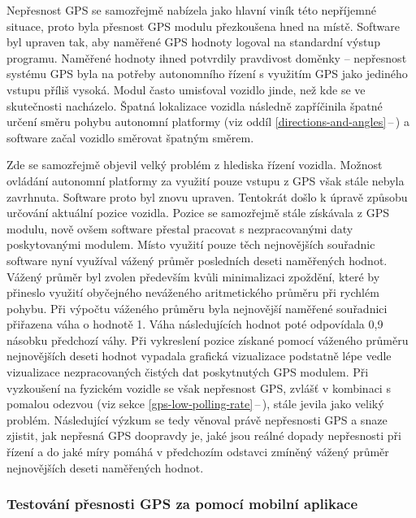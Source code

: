 \documentclass[czech, bachelor]{diploma}
\newcommand{\peteref}[1]{\ref{#1}\,--\,\nameref{#1}}
\begin{document}
Nepřesnost GPS se samozřejmě nabízela jako hlavní viník této nepříjemné situace, proto byla přesnost GPS modulu přezkoušena hned
na místě. Software byl upraven tak, aby naměřené GPS hodnoty logoval na standardní výstup programu. Naměřené hodnoty ihned
potvrdily pravdivost doměnky -- nepřesnost systému GPS byla na potřeby autonomního řízení s využitím GPS jako jediného vstupu
příliš vysoká. Modul často umisťoval vozidlo jinde, než kde se ve skutečnosti nacházelo. Špatná lokalizace vozidla následně
zapříčinila špatné určení směru pohybu autonomní platformy (viz oddíl \peteref{directions-and-angles}) a software začal vozidlo
směrovat špatným směrem.

Zde se samozřejmě objevil velký problém z hlediska řízení vozidla. Možnost ovládání autonomní platformy za využití pouze vstupu
z GPS však stále nebyla zavrhnuta. Software proto byl znovu upraven. Tentokrát došlo k úpravě způsobu určování aktuální pozice
vozidla. Pozice se samozřejmě stále získávala z GPS modulu, nově ovšem software přestal pracovat s nezpracovanými daty
poskytovanými modulem. Místo využití pouze těch nejnovějších souřadnic software nyní využíval vážený průměr posledních deseti
naměřených hodnot. Vážený průměr byl zvolen především kvůli minimalizaci zpoždění, které by přineslo využití obyčejného neváženého
aritmetického průměru při rychlém pohybu. Při výpočtu váženého průměru byla nejnovější naměřené souřadnici přiřazena váha
o hodnotě 1. Váha následujících hodnot poté odpovídala 0,9 násobku předchozí váhy. Při vykreslení pozice získané pomocí váženého
průměru nejnovějších deseti hodnot vypadala grafická vizualizace podstatně lépe vedle vizualizace nezpracovaných čistých dat
poskytnutých GPS modulem. Při vyzkoušení na fyzickém vozidle se však nepřesnost GPS, zvlášť v kombinaci s pomalou odezvou (viz
sekce \peteref{gps-low-polling-rate}), stále jevila jako veliký problém. Následující výzkum se tedy věnoval právě nepřesnosti GPS
a snaze zjistit, jak nepřesná GPS doopravdy je, jaké jsou reálné dopady nepřesnosti při řízení a do jaké míry pomáhá v předchozím
odstavci zmíněný vážený průměr nejnovějších deseti naměřených hodnot.

\subsubsection{Testování přesnosti GPS za pomocí mobilní aplikace}
\end{document}
